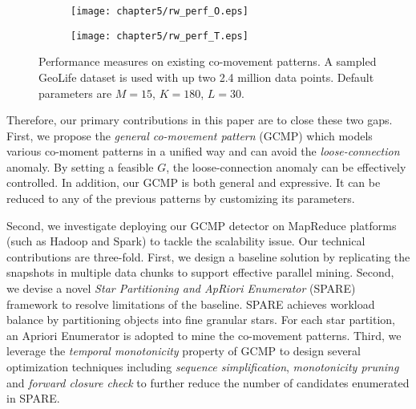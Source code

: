 \begin{figure}[h]
	\vspace{-3mm}
    \centering
    \begin{subfigure}[b]{0.45\textwidth}
            \centering
            \texttt{[image: chapter5/rw\_perf\_O.eps]}
    \label{fig:fig1}
    \end{subfigure}
    \begin{subfigure}[b]{0.45\textwidth}
            \centering
            \texttt{[image: chapter5/rw\_perf\_T.eps]}
    \label{fig:fig2}
    \end{subfigure}
    \vspace{-2mm}
    \caption{Performance measures on existing co-movement patterns. A sampled GeoLife dataset
    is used with up two 2.4 million data points. Default parameters are $M=15$, $K=180$, $L=30$.}
    \label{fig:related_work_scalability}
\end{figure}

Therefore, our primary contributions in this paper are to close these two gaps. 
First, we propose the \emph{general co-movement pattern} (GCMP) which models
various co-moment patterns in a unified way and can avoid 
the \emph{loose-connection} anomaly.   By setting a feasible $G$, the loose-connection anomaly can be effectively controlled. In addition, our GCMP is both general and expressive. It can be reduced to any of the previous patterns by customizing its parameters.

Second, we investigate deploying our GCMP detector on MapReduce platforms (such as Hadoop and Spark) to tackle the scalability issue. Our technical contributions are three-fold. First, we design a baseline solution by replicating the snapshots in multiple data chunks to support effective parallel mining. Second, we devise a novel \emph{Star Partitioning and ApRiori Enumerator} (SPARE) framework to resolve limitations of the baseline. SPARE achieves workload balance by partitioning objects into fine granular stars.  For each star partition, an Apriori Enumerator is adopted to mine the co-movement patterns. Third, we leverage the \emph{temporal monotonicity} property of GCMP 
to design several optimization techniques including \emph{sequence simplification}, \emph{monotonicity pruning} and \emph{forward closure check} to further reduce the number of candidates enumerated in SPARE.

